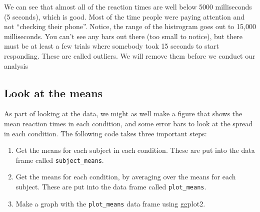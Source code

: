 \documentclass[]{book}
\providecommand{\tightlist}{%
  \setlength{\itemsep}{0pt}\setlength{\parskip}{0pt}}
\theoremstyle{definition}
\theoremstyle{definition}
\theoremstyle{definition}
\theoremstyle{remark}
\begin{document}
We can see that almost all of the reaction times are well below 5000
milliseconds (5 seconds), which is good. Most of the time people were
paying attention and not ``checking their phone''. Notice, the range of
the histrogram goes out to 15,000 milliseconds. You can't see any bars
out there (too small to notice), but there must be at least a few trials
where somebody took 15 seconds to start responding. These are called
outliers. We will remove them before we conduct our analysis

\subsection{Look at the means}\label{look-at-the-means}

As part of looking at the data, we might as well make a figure that
shows the mean reaction times in each condition, and some error bars to
look at the spread in each condition. The following code takes three
important steps:

\begin{enumerate}
\def\labelenumi{\arabic{enumi}.}
\tightlist
\item
  Get the means for each subject in each condition. These are put into
  the data frame called \texttt{subject\_means}.
\item
  Get the means for each condition, by averaging over the means for each
  subject. These are put into the data frame called
  \texttt{plot\_means}.
\item
  Make a graph with the \texttt{plot\_means} data frame using ggplot2.
\end{enumerate}
\end{document}
